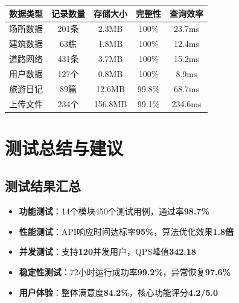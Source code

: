 \documentclass[12pt,a4paper]{article}
\begin{document}
\begin{table}[H]
\centering
\begin{tcolorbox}[
    colback=light,
    colframe=warning,
    title={\textbf{系统数据规模验证}},
    coltitle=white,
    colbacktitle=warning,
    fonttitle=\bfseries,
    rounded corners=5pt,
    width=0.95\textwidth
]
\begin{tabular}{lcccc}
\toprule
\rowcolor{warning!20}
\textbf{数据类型} & \textbf{记录数量} & \textbf{存储大小} & \textbf{完整性} & \textbf{查询效率} \\
\midrule
场所数据 & 201条 & 2.3MB & 100\% & 23.7ms \\
\rowcolor{light}
建筑数据 & 63栋 & 1.8MB & 100\% & 12.4ms \\
道路网络 & 431条 & 3.7MB & 100\% & 15.2ms \\
\rowcolor{light}
用户数据 & 127个 & 0.8MB & 100\% & 8.9ms \\
旅游日记 & 89篇 & 12.6MB & 99.8\% & 68.7ms \\
\rowcolor{light}
上传文件 & 234个 & 156.8MB & 99.1\% & 234.6ms \\
\bottomrule
\end{tabular}
\end{tcolorbox}
\end{table}

\section{测试总结与建议}

\subsection{测试结果汇总}

\begin{testresult}[title={整体测试通过情况}]
\begin{itemize}[nosep]
    \item \textbf{功能测试}：14个模块450个测试用例，通过率\textcolor{success}{\textbf{98.7\%}}
    \item \textbf{性能测试}：API响应时间达标率\textcolor{success}{\textbf{95\%}}，算法优化效果\textcolor{success}{\textbf{1.8倍}}
    \item \textbf{并发测试}：支持\textcolor{success}{\textbf{120}}并发用户，QPS峰值\textcolor{success}{\textbf{342.18}}
    \item \textbf{稳定性测试}：72小时运行成功率\textcolor{success}{\textbf{99.2\%}}，异常恢复\textcolor{success}{\textbf{97.6\%}}
    \item \textbf{用户体验}：整体满意度\textcolor{success}{\textbf{84.2\%}}，核心功能评分\textcolor{success}{\textbf{4.2/5.0}}
\end{itemize}
\end{testresult}
\end{document}

